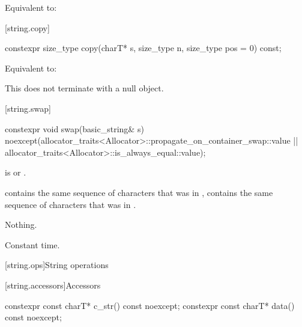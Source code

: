 \begin{itemdescr}
\pnum
\effects
Equivalent to: 
\end{itemdescr}

[string.copy]{}

%
\begin{itemdecl}
constexpr size_type copy(charT* s, size_type n, size_type pos = 0) const;
\end{itemdecl}

\begin{itemdescr}
\pnum
\effects
Equivalent to:
\begin{note}
This does not terminate  with a null object.
\end{note}
\end{itemdescr}

[string.swap]{}

%
\begin{itemdecl}
constexpr void swap(basic_string& s)
  noexcept(allocator_traits<Allocator>::propagate_on_container_swap::value ||
           allocator_traits<Allocator>::is_always_equal::value);
\end{itemdecl}

\begin{itemdescr}
\pnum
\expects
{} is 
or
.

\pnum
\ensures
{}
contains the same sequence of characters that was in ,
 contains the same sequence of characters that was in
.

\pnum
\throws
Nothing.

\pnum
\complexity
Constant time.
\end{itemdescr}

[string.ops]{String operations}

[string.accessors]{Accessors}

%
%
\begin{itemdecl}
constexpr const charT* c_str() const noexcept;
constexpr const charT* data() const noexcept;
\end{itemdecl}

